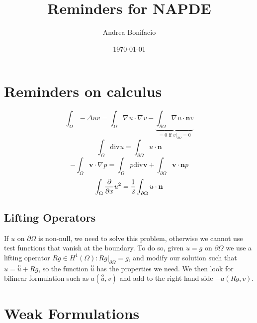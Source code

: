 \documentclass[a4paper,11pt]{article}
\theoremstyle{break}
\renewcommand*{\grad}{\nabla\mspace{1mu}}
\renewcommand*{\div}{\text{div}\mspace{1mu}}
\newcommand{\vect}[1]{\textbf{#1}}
\newcommand*{\txt}[1]{\text{#1}}
\newcommand*{\limited}[1]{\vert_{#1}}
\newcommand{\boundary}{{\partial\Omega}}
\newcommand{\onehalf}{\frac{1}{2}}
\newcommand{\normal}{\vect{n}}
\newcommand{\vvec}{\vect{v}}
\numberwithin{equation}{section}
\begin{document}
\title{Reminders for NAPDE}
\author{Andrea Bonifacio}
\date{\today}
\maketitle
\section*{Reminders on calculus}
\[
    \int_\Omega-\Delta u v = \int_\Omega \grad u \cdot \grad v - \underbrace{\int_{\boundary}  \grad u \cdot \vect{n} v}_{= 0 \txt{ if } v\vert_{\boundary} = 0}
\]
\[
    \int_\Omega \div u = \int_\boundary u \cdot \vect{n} 
\]
\[
    -\int_\Omega \vect{v} \cdot \grad p = \int_\Omega p\div \vect{v} + \int_\boundary \vvec \cdot \normal p
\]
\[
    \int_\Omega \pderivative{x}u^2 = \onehalf \int_\boundary u\cdot \normal  
\]
\subsection*{Lifting Operators}
If \(u\) on \(\boundary\) is non-null, we need to solve this problem, otherwise we cannot use test functions that vanish at the boundary. To do so, given \(u = g \txt{ on }\boundary\) we use a lifting operator \(Rg \in H^1(\Omega) : Rg\limited{\boundary} = g\), and modify our solution such that \(u = \overset{\mathrm{o}}{u} + Rg\), so the function \(\overset{\mathrm{o}}{u}\) has the properties we need. We then look for bilinear formulation such as \(a(\overset{\mathrm{o}}{u}, v)\) and add to the right-hand side \(-a(Rg, v)\).
\section*{Weak Formulations}
\end{document}
